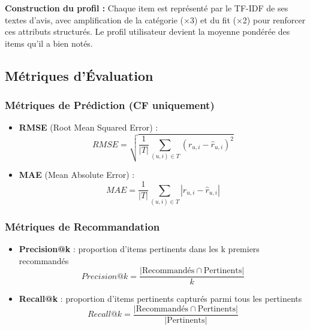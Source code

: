 \documentclass[12pt,a4paper]{article}
\begin{document}
\textbf{Construction du profil :} Chaque item est représenté par le TF-IDF de ses textes d'avis, avec amplification de la catégorie ($\times$3) et du fit ($\times$2) pour renforcer ces attributs structurés. Le profil utilisateur devient la moyenne pondérée des items qu'il a bien notés.

\subsection{Métriques d'Évaluation}

\subsubsection{Métriques de Prédiction (CF uniquement)}

\begin{itemize}
    \item \textbf{RMSE} (Root Mean Squared Error) : 
    \begin{equation}
    RMSE = \sqrt{\frac{1}{|T|} \sum_{(u,i) \in T} (r_{u,i} - \hat{r}_{u,i})^2}
    \end{equation}
    
    \item \textbf{MAE} (Mean Absolute Error) :
    \begin{equation}
    MAE = \frac{1}{|T|} \sum_{(u,i) \in T} |r_{u,i} - \hat{r}_{u,i}|
    \end{equation}
\end{itemize}

\subsubsection{Métriques de Recommandation}

\begin{itemize}
    \item \textbf{Precision@k} : proportion d'items pertinents dans les k premiers recommandés
    \begin{equation}
    Precision@k = \frac{|\text{Recommandés} \cap \text{Pertinents}|}{k}
    \end{equation}
    
    \item \textbf{Recall@k} : proportion d'items pertinents capturés parmi tous les pertinents
    \begin{equation}
    Recall@k = \frac{|\text{Recommandés} \cap \text{Pertinents}|}{|\text{Pertinents}|}
    \end{equation}
\end{itemize}
\end{document}
